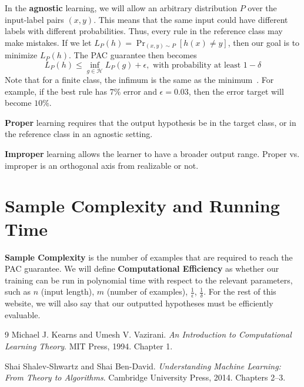 \documentclass[11pt,fleqn]{article}
\newcommand{\Hy}{\mathcal H}
\newcommand{\eps}{\epsilon}
\begin{document}
In the \textbf{agnostic} learning, we will allow an arbitrary distribution $P$ over the input-label pairs $(x, y)$. This means that the same input could have different labels with different probabilities. Thus, every rule in the reference class may make mistakes. If we let $L_P(h) = \Pr_{(x,y) \sim P}[h(x) \neq y]$, then our goal is to minimize $L_P(h)$. The PAC guarantee then becomes
\[\boxed{L_P(h) \leq \inf_{g \in \Hy} L_P(g) + \eps, \text{ with probability at least } 1-\delta}\]
Note that for a finite class, the infimum is the same as the minimum~\cite{ssbd}. For example, if the best rule has $7\%$ error and $\eps = 0.03$, then the error target will become $10\%$.\par

\textbf{Proper} learning requires that the output hypothesis be in the target class, or in the reference class in an agnostic setting.\par

\textbf{Improper} learning allows the learner to have a broader output range. Proper vs. improper is an orthogonal axis from realizable or not.

\section{Sample Complexity and Running Time}

\textbf{Sample Complexity} is the number of examples that are required to reach the PAC guarantee. We will define \textbf{Computational Efficiency} as whether our training can be run in polynomial time with respect to the relevant parameters, such as $n$ (input length), $m$ (number of examples), $\frac{1}{\eps}$, $\frac{1}{\delta}$. For the rest of this website, we will also say that our outputted hypotheses must be efficiently evaluable.

\begin{thebibliography}{9}
Michael J. Kearns and Umesh V. Vazirani.
\emph{An Introduction to Computational Learning Theory}.
MIT Press, 1994. Chapter 1.

Shai Shalev-Shwartz and Shai Ben-David.
\emph{Understanding Machine Learning: From Theory to Algorithms}.
Cambridge University Press, 2014. Chapters 2--3.
\end{thebibliography}
\end{document}
